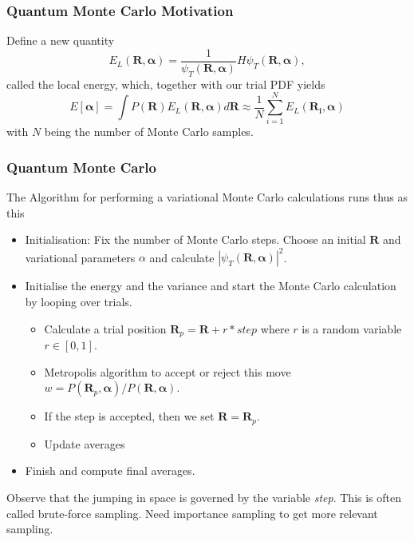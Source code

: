 \documentclass{beamer}
\begin{document}
\begin{frame}
\frametitle{Quantum Monte Carlo Motivation}

\begin{block}{Define a new quantity }
\[
   E_L(\bm{R},\bm{\alpha})=\frac{1}{\psi_T(\bm{R},\bm{\alpha})}H\psi_T(\bm{R},\bm{\alpha}),
\]
called the local energy, which, together with our trial PDF yields
\[
  E[\bm{\alpha}]=\int P(\bm{R})E_L(\bm{R},\bm{\alpha}) d\bm{R}\approx \frac{1}{N}\sum_{i=1}^NE_L(\bm{R_i},\bm{\alpha})
\]
with $N$ being the number of Monte Carlo samples.
\end{block}
\end{frame}

\begin{frame}
\frametitle{Quantum Monte Carlo}

\begin{block}{}
The Algorithm for performing a variational Monte Carlo calculations runs thus as this

\begin{itemize}
   \item Initialisation: Fix the number of Monte Carlo steps. Choose an initial $\bm{R}$ and variational parameters $\alpha$ and calculate $\left|\psi_T(\bm{R},\bm{\alpha})\right|^2$. 

   \item Initialise the energy and the variance and start the Monte Carlo calculation by looping over trials.
\begin{itemize}

      \item Calculate  a trial position  $\bm{R}_p=\bm{R}+r*step$ where $r$ is a random variable $r \in [0,1]$.

      \item Metropolis algorithm to accept or reject this move  $w = P(\bm{R}_p,\bm{\alpha})/P(\bm{R},\bm{\alpha})$.

      \item If the step is accepted, then we set $\bm{R}=\bm{R}_p$. 

      \item Update averages

\end{itemize}

\noindent
   \item Finish and compute final averages.
\end{itemize}

\noindent
Observe that the jumping in space is governed by the variable \emph{step}. This is often called brute-force sampling.
Need importance sampling to get more relevant sampling. 
\end{block}
\end{frame}
\end{document}
